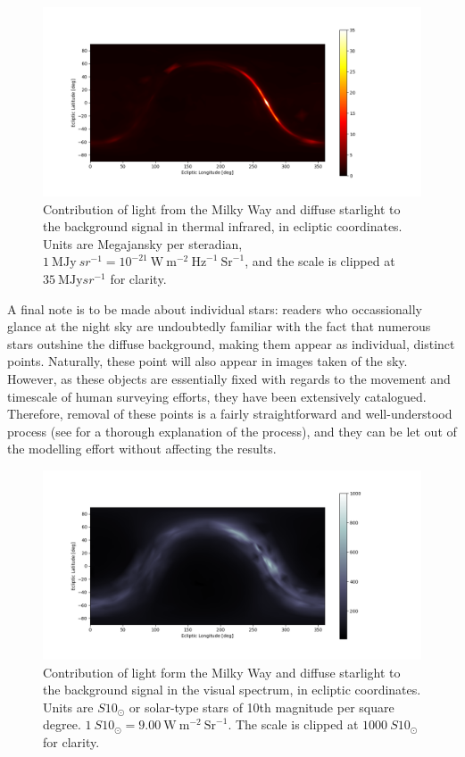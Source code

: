 \begin{figure}[htbp]
 \centering
 \includegraphics[width=1.0\textwidth]{img/background_tir_stars.png}
 \caption{Contribution of light from the Milky Way and diffuse starlight to the background signal in thermal infrared, in ecliptic coordinates. Units are Megajansky per steradian, $1 ~\mathrm{MJy}~{sr}^{-1} = 10^{-21} ~\mathrm{W}~\mathrm{m}^{-2}~\mathrm{Hz}^{-1}~\mathrm{Sr}^{-1}$, and the scale is clipped at $35 ~\mathrm{MJy}{sr}^{-1}$ for clarity.}
 \label{fig:starstirbackground}
\end{figure}

A final note is to be made about individual stars: readers who occassionally glance at the night sky are undoubtedly familiar with the fact that numerous stars outshine the diffuse background, making them appear as individual, distinct points. Naturally, these point will also appear in images taken of the sky. However, as these objects are essentially fixed with regards to the movement and timescale of human surveying efforts, they have been extensively catalogued. Therefore, removal of these points is a fairly straightforward and well-understood process (see \cite{StarRemoval} for a thorough explanation of the process), and they can be let out of the modelling effort without affecting the results.

\begin{figure}[htbp]
 \centering
 \includegraphics[width=1.0\textwidth]{img/background_vis_stars.png}
 \caption{Contribution of light form the Milky Way and diffuse starlight to the background signal in the visual spectrum, in ecliptic coordinates. Units are $S10_\odot$ or solar-type stars of 10th magnitude per square degree. $1~S10_\odot = 9.00~\mathrm{W}~\mathrm{m}^{-2}~\mathrm{Sr}^{-1}$. The scale is clipped at $1000 ~S10_\odot$ for clarity.}
 \label{fig:starsvisbackground}
\end{figure}


